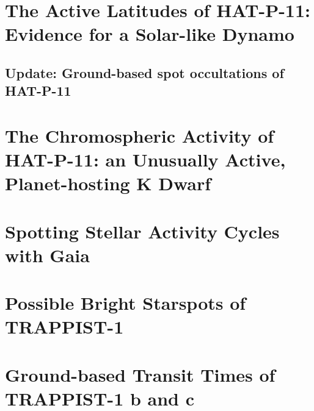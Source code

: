 \documentclass[11pt, proquest]{uwthesis}
\begin{document}


\chapter{The Active Latitudes of HAT-P-11: Evidence for a Solar-like Dynamo}



\section*{Update: Ground-based spot occultations of HAT-P-11}


\chapter{The Chromospheric Activity of HAT-P-11: an Unusually Active, Planet-hosting K Dwarf}



\chapter{Spotting Stellar Activity Cycles with Gaia}



\chapter{Possible Bright Starspots of TRAPPIST-1}



\chapter{Ground-based Transit Times of TRAPPIST-1 b and c}



\printendnotes

%
%
\nocite{*}   %



%
%
\appendix
\raggedbottom\sloppy
 

\end{document}
